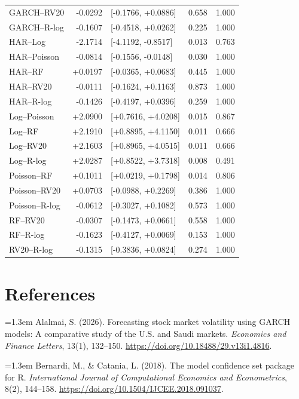 \begin{longtable}{@{}lrlll@{}}
GARCH--RV20 & -0.0292 & [-0.1766, +0.0886] & 0.658 & 1.000 \\
GARCH--R-log & -0.1607 & [-0.4518, +0.0262] & 0.225 & 1.000 \\
HAR--Log & -2.1714 & [-4.1192, -0.8517] & 0.013 & 0.763 \\
HAR--Poisson & -0.0814 & [-0.1556, -0.0148] & 0.030 & 1.000 \\
HAR--RF & +0.0197 & [-0.0365, +0.0683] & 0.445 & 1.000 \\
HAR--RV20 & -0.0111 & [-0.1624, +0.1163] & 0.873 & 1.000 \\
HAR--R-log & -0.1426 & [-0.4197, +0.0396] & 0.259 & 1.000 \\
Log--Poisson & +2.0900 & [+0.7616, +4.0208] & 0.015 & 0.867 \\
Log--RF & +2.1910 & [+0.8895, +4.1150] & 0.011 & 0.666 \\
Log--RV20 & +2.1603 & [+0.8965, +4.0515] & 0.011 & 0.666 \\
Log--R-log & +2.0287 & [+0.8522, +3.7318] & 0.008 & 0.491 \\
Poisson--RF & +0.1011 & [+0.0219, +0.1798] & 0.014 & 0.806 \\
Poisson--RV20 & +0.0703 & [-0.0988, +0.2269] & 0.386 & 1.000 \\
Poisson--R-log & -0.0612 & [-0.3027, +0.1082] & 0.573 & 1.000 \\
RF--RV20 & -0.0307 & [-0.1473, +0.0661] & 0.558 & 1.000 \\
RF--R-log & -0.1623 & [-0.4127, +0.0069] & 0.153 & 1.000 \\
RV20--R-log & -0.1315 & [-0.3836, +0.0824] & 0.274 & 1.000 \\
\bottomrule\end{longtable}\endgroup

\section*{References}
\begingroup\small\sloppy\setlength{\parskip}{5pt}
\noindent\hangindent=1.3em Alalmai, S. (2026). Forecasting stock market volatility using GARCH models: A comparative study of the U.S. and Saudi markets. \emph{Economics and Finance Letters}, 13(1), 132--150. \url{https://doi.org/10.18488/29.v13i1.4816}.

\noindent\hangindent=1.3em Bernardi, M., \& Catania, L. (2018). The model confidence set package for R. \emph{International Journal of Computational Economics and Econometrics}, 8(2), 144--158. \url{https://doi.org/10.1504/IJCEE.2018.091037}.

